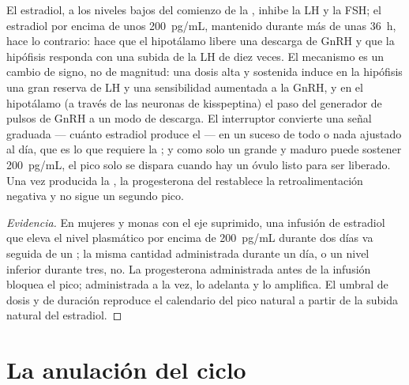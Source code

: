 \begin{theorem}\label{thm:b2:reproductive-hormones:switch}
El estradiol, a los niveles bajos del comienzo de la ,
inhibe la LH y la FSH; el estradiol por encima de unos
\qty{200}{pg/mL}, mantenido durante más de unas \qty{36}{h}, hace lo
contrario: hace que el hipotálamo libere una descarga de GnRH y que la
hipófisis responda con una subida de la LH de diez veces. El mecanismo es
un cambio de signo, no de magnitud: una dosis alta y sostenida induce en
la hipófisis una gran reserva de LH y una sensibilidad aumentada a la
GnRH, y en el hipotálamo (a través de las neuronas de kisspeptina) el paso
del generador de pulsos de GnRH a un modo de descarga. El interruptor
convierte una señal graduada --- cuánto estradiol produce el  ---
en un suceso de todo o nada ajustado al día, que es lo que requiere la
; y como solo un  grande y maduro puede sostener
\qty{200}{pg/mL}, el pico solo se dispara cuando hay un óvulo listo para
ser liberado. Una vez producida la , la progesterona del  restablece la retroalimentación negativa y no sigue un segundo
pico.
\end{theorem}
\begin{proof}[Evidencia]
En mujeres y monas con el eje suprimido, una infusión de estradiol que
eleva el nivel plasmático por encima de \qty{200}{pg/mL} durante dos días
va seguida de un ; la misma cantidad administrada durante un
día, o un nivel inferior durante tres, no. La progesterona administrada
antes de la infusión bloquea el pico; administrada a la vez, lo adelanta
y lo amplifica. El umbral de dosis y de duración reproduce el calendario
del pico natural a partir de la subida natural del estradiol.
\end{proof}

\section{La anulación del ciclo}

